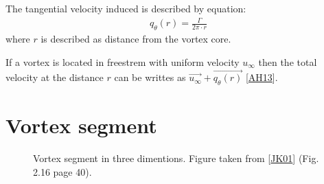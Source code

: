 \documentclass[a4paper,12pt,english]{jupyterBook}
\begin{document}
\sphinxAtStartPar
The tangential velocity induced is described by equation:
\begin{equation*}
\begin{split}
q_\theta(r) = \frac{\Gamma}{2\pi \cdot r}
\end{split}
\end{equation*}
\sphinxAtStartPar
where \(r\) is described as distance from the vortex core.

\sphinxAtStartPar
If a vortex is located in free\sphinxhyphen{}strem with uniform velocity \(u_\infty\) then the total velocity at the distance \(r\) can be writtes as \(\overrightarrow{u_\infty} + \overrightarrow{q_\theta(r)}\) {[}\hyperlink{cite.chapters/bibliography:id3}{AH13}{]}.


\section{Vortex segment}
\label{\detokenize{chapters/description/theory:vortex-segment}}
\begin{figure}[htbp]
\centering
\capstart

\noindent{}
\caption{Vortex segment in three dimentions. Figure taken from {[}\hyperlink{cite.chapters/bibliography:id4}{JK01}{]} (Fig. 2.16 page 40).}\label{\detokenize{chapters/description/theory:id10}}\end{figure}
\end{document}
